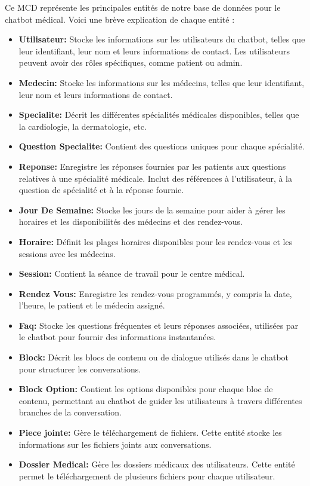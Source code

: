 Ce MCD représente les principales entités de notre base de données pour le chatbot médical. Voici une brève explication de chaque entité :


\begin{itemize}
  \item \textbf{Utilisateur: }Stocke les informations sur les utilisateurs du chatbot, telles que leur identifiant, leur nom et leurs informations de contact. Les utilisateurs peuvent avoir des rôles spécifiques, comme patient ou admin.
  \item \textbf{Medecin: }Stocke les informations sur les médecins, telles que leur identifiant, leur nom et leurs informations de contact.
  \item \textbf{Specialite: }Décrit les différentes spécialités médicales disponibles, telles que la cardiologie, la dermatologie, etc.
  \item \textbf{Question Specialite: }Contient des questions uniques pour chaque spécialité.
  \item \textbf{Reponse: }Enregistre les réponses fournies par les patients aux questions relatives à une spécialité médicale. Inclut des références à l'utilisateur, à la question de spécialité et à la réponse fournie.
  \item \textbf{Jour De Semaine: }Stocke les jours de la semaine pour aider à gérer les horaires et les disponibilités des médecins et des rendez-vous.
  \item \textbf{Horaire: }Définit les plages horaires disponibles pour les rendez-vous et les sessions avec les médecins.
  \item \textbf{Session: }Contient la séance de travail pour le centre médical.
  \item \textbf{Rendez Vous: }Enregistre les rendez-vous programmés, y compris la date, l'heure, le patient et le médecin assigné.
  \item \textbf{Faq: }Stocke les questions fréquentes et leurs réponses associées, utilisées par le chatbot pour fournir des informations instantanées.
  \item \textbf{Block: }Décrit les blocs de contenu ou de dialogue utilisés dans le chatbot pour structurer les conversations.
  \item \textbf{Block Option: }Contient les options disponibles pour chaque bloc de contenu, permettant au chatbot de guider les utilisateurs à travers différentes branches de la conversation.
  \item \textbf{Piece jointe: }Gère le téléchargement de fichiers. Cette entité stocke les informations sur les fichiers joints aux conversations.
  \item \textbf{Dossier Medical: }Gère les dossiers médicaux des utilisateurs. Cette entité permet le téléchargement de plusieurs fichiers pour chaque utilisateur.
\end{itemize}



